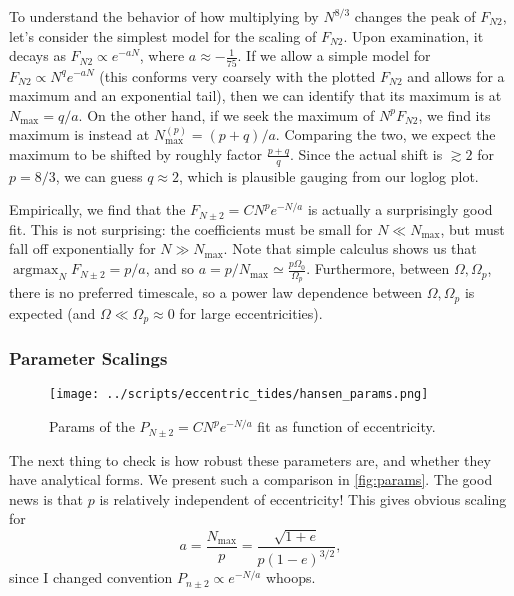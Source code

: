 \documentclass[11pt,
        usenames, %
        dvipsnames %
    ]{article}
\newcommand*{\p}[1]{\left(#1\right)}
\DeclareMathOperator*{\argmax}{argmax}
\begin{document}
To understand the behavior of how multiplying by $N^{8/3}$ changes the peak of
$F_{N2}$, let's consider the simplest model for the scaling of $F_{N2}$. Upon
examination, it decays as $F_{N2} \propto e^{-aN}$, where $a \approx
-\frac{1}{75}$. If we allow a simple model for $F_{N2} \propto N^q e^{-aN}$
(this conforms very coarsely with the plotted $F_{N2}$ and allows for a maximum
and an exponential tail), then we can identify that its maximum is at $N_{\max}
= q/a$. On the other hand, if we seek the maximum of $N^{p}F_{N2}$, we find its
maximum is instead at $N_{\max}^{(p)} = (p + q) / a$. Comparing the two, we
expect the maximum to be shifted by roughly factor $\frac{p + q}{q}$. Since the
actual shift is $\gtrsim 2$ for $p = 8/3$, we can guess $q \approx 2$, which is
plausible gauging from our loglog plot.

Empirically, we find that the $F_{N\pm 2} = CN^pe^{-N/a}$ is actually a
surprisingly good fit. This is not surprising: the coefficients must be small
for $N \ll N_{\max}$, but must fall off exponentially for $N \gg N_{\max}$. Note
that simple calculus shows us that $\argmax_N F_{N \pm 2} = p/a$, and so $a =
p / N_{\max} \simeq \frac{p\Omega_0}{\Omega_p}$. Furthermore, between $\Omega,
\Omega_p$, there is no preferred timescale, so a power law dependence between
$\Omega, \Omega_p$ is expected (and $\Omega \ll \Omega_p \approx 0$ for large
eccentricities).

\subsubsection{Parameter Scalings}

\begin{figure}[t]
    \centering
    \texttt{[image: ../scripts/eccentric\_tides/hansen\_params.png]}
    \caption{Params of the $P_{N \pm 2} = CN^pe^{-N/a}$ fit as function of
    eccentricity.}\label{fig:params}
\end{figure}
The next thing to check is how robust these parameters are, and whether they
have analytical forms. We present such a comparison in \autoref{fig:params}.
The good news is that $p$ is relatively independent of eccentricity! This gives
obvious scaling for
\begin{equation}
    a = \frac{N_{\max}}{p} = \frac{\sqrt{1 + e}}{p\p{1 - e}^{3/2}},
\end{equation}
since I changed convention $P_{n \pm 2} \propto e^{-N/a}$ whoops.
\end{document}
